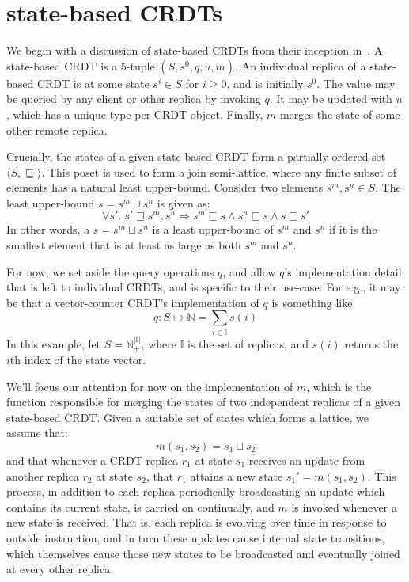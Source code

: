 \section{state-based CRDTs}
We begin with a discussion of state-based CRDTs from their inception
in~\citep{shapario11}. A state-based CRDT is a 5-tuple $(S, s^0, q, u, m)$. An
individual replica of a state-based CRDT is at some state $s^i \in S$ for $i \ge
0$, and is initially $s^0$. The value may be queried by any client or other
replica by invoking $q$. It may be updated with $u$, which has a unique type per
CRDT object. Finally, $m$ merges the state of some other remote replica.

Crucially, the states of a given state-based CRDT form a partially-ordered set
$\langle S, \sqsubseteq \rangle$. This poset is used to form a join
semi-lattice, where any finite subset of elements has a natural least
upper-bound. Consider two elements $s^m, s^n \in S$. The least upper-bound
$s = s^m \sqcup s^n$ is given as:
\[
  \forall s'.\; s' \sqsupseteq s^m, s^n \Rightarrow
    s^m \sqsubseteq s \land
    s^n \sqsubseteq s \land
    s \sqsubseteq s'
\]
In other words, a $s = s^m \sqcup s^n$ is a least upper-bound of $s^m$ and $s^n$
if it is the smallest element that is at least as large as both $s^m$ and $s^n$.

For now, we set aside the query operations $q$, and allow $q$'s implementation
detail that is left to individual CRDTs, and is specific to their use-case. For
e.g., it may be that a vector-counter CRDT's implementation of $q$ is
something like:
\[
  q : S \mapsto \mathbb{N} = \sum_{i \in \mathbb{I}} s(i)
\]
In this example, let $S = \mathbb{N}^{|\mathbb{I}|}_+$, where $\mathbb{I}$ is
the set of replicas, and $s(i)$ returns the $i$th index of the state vector.

We'll focus our attention for now on the implementation of $m$, which is the
function responsible for merging the states of two independent replicas of a
given state-based CRDT. Given a suitable set of states which forms a lattice, we
assume that:
\[
  m(s_1, s_2) = s_1 \sqcup s_2
\]
and that whenever a CRDT replica $r_1$ at state $s_1$ receives an update from
another replica $r_2$ at state $s_2$, that $r_1$ attains a new state $s_1' =
m(s_1, s_2)$. This process, in addition to each replica periodically
broadcasting an update which contains its current state, is carried on
continually, and $m$ is invoked whenever a new state is received. That is, each
replica is evolving over time in response to outside instruction, and in turn
these updates cause internal state transitions, which themselves cause those new
states to be broadcasted and eventually joined at every other replica.

